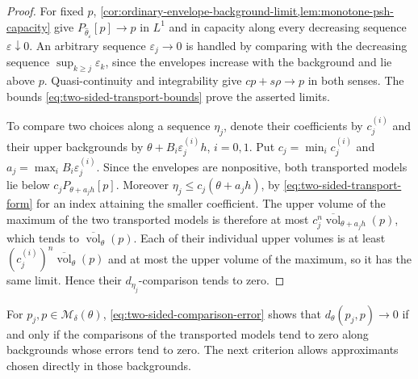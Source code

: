 \begin{proof}
For fixed $p$, \cref{cor:ordinary-envelope-background-limit,lem:monotone-psh-capacity} give $P_{\widehat\theta_\varepsilon}[p]\to p$ in $L^1$ and in capacity along every decreasing sequence $\varepsilon\downarrow0$. An arbitrary sequence $\varepsilon_j\to0$ is handled by comparing with the decreasing sequence $\sup_{k\geq j}\varepsilon_k$, since the envelopes increase with the background and lie above $p$. Quasi-continuity and integrability give $cp+s\rho\to p$ in both senses. The bounds \eqref{eq:two-sided-transport-bounds} prove the asserted limits.

To compare two choices along a sequence $\eta_j$, denote their coefficients by $c_j^{(i)}$ and their upper backgrounds by $\theta+B_i\varepsilon_j^{(i)}h$, $i=0,1$. Put $c_j=\min_i c_j^{(i)}$ and $a_j=\max_i B_i\varepsilon_j^{(i)}$. Since the envelopes are nonpositive, both transported models lie below $c_jP_{\theta+a_jh}[p]$. Moreover $\eta_j\leq c_j(\theta+a_jh)$, by \eqref{eq:two-sided-transport-form} for an index attaining the smaller coefficient. The upper volume of the maximum of the two transported models is therefore at most $c_j^n\overline{\operatorname{vol}}_{\theta+a_jh}(p)$, which tends to $\overline{\operatorname{vol}}_\theta(p)$. Each of their individual upper volumes is at least $(c_j^{(i)})^n\overline{\operatorname{vol}}_\theta(p)$ and at most the upper volume of the maximum, so it has the same limit. Hence their $d_{\eta_j}$-comparison tends to zero.
\end{proof}

For $p_j,p\in\mathcal M_\delta(\theta)$, \eqref{eq:two-sided-comparison-error} shows that $d_\theta(p_j,p)\to0$ if and only if the comparisons of the transported models tend to zero along backgrounds whose errors tend to zero. The next criterion allows approximants chosen directly in those backgrounds.


